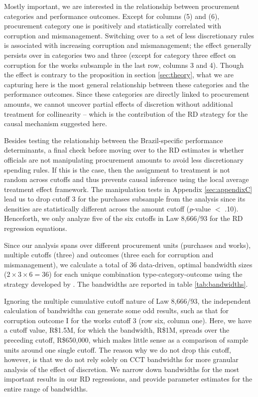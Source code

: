 \documentclass[11pt]{article}
\begin{document}
Mostly important, we are interested in the relationship between procurement categories and performance outcomes. Except for columns (5) and (6), procurement category one is positively and statistically correlated with corruption and mismanagement. Switching over to a set of less discretionary rules is associated with increasing corruption and mismanagement; the effect generally persists over in categories two and three (except for category three effect on corruption for the works subsample in the last row, columns 3 and 4). Though the effect is contrary to the proposition in section \ref{sec:theory}, what we are capturing here is the most general relationship between these categories and the performance outcomes. Since these categories are directly linked to procurement amounts, we cannot uncover partial effects of discretion without additional treatment for collinearity -- which is the contribution of the RD strategy for the causal mechanism suggested here.

Besides testing the relationship between the Brazil-specific performance determinants, a final check before moving over to the RD estimates is whether officials are not manipulating procurement amounts to avoid less discretionary spending rules. If this is the case, then the assignment to treatment is not random across cutoffs and thus prevents causal inference using the local average treatment effect framework. The manipulation tests in Appendix \ref{sec:appendixC} lead us to drop cutoff 3 for the purchases subsample from the analysis since its densities are statistically different across the amount cutoff (\emph{p}-value $<$ .10). Henceforth, we only analyze five of the six cutoffs in Law 8,666/93 for the RD regression equations.

Since our analysis spans over different procurement units (purchases and works), multiple cutoffs (three) and outcomes (three each for corruption and mismanagement), we calculate a total of 36 data-driven, optimal bandwidth sizes ($2 \times 3 \times 6 = 36$) for each unique combination type-category-outcome using the strategy developed by \citet{CalonicoOptimalDataDrivenRegression2015}. The bandwidths are reported in table \ref{tab:bandwidths}.

Ignoring the multiple cumulative cutoff nature of Law 8,666/93, the independent calculation of bandwidths can generate some odd results, such as that for corruption outcome I for the works cutoff 3 (row six, column one). Here, we have a cutoff value, R\$1.5M, for which the bandwidth, R\$1M, spreads over the preceding cutoff, R\$650,000, which makes little sense as a comparison of sample units around one single cutoff. The reason why we do not drop this cutoff, however, is that we do not rely solely on CCT bandwidths for more granular analysis of the effect of discretion. We narrow down bandwidths for the most important results in our RD regressions, and provide parameter estimates for the entire range of bandwidths.
\end{document}
